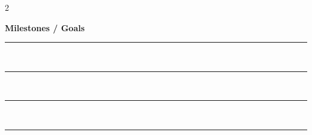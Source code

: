 \documentclass[10pt,letterpaper]{article}
\begin{document}
\begin{paracol}{2}
\begin{tcolorbox}[sheetbox,title=\textbf{Advancement \& Notes},breakable]
\textbf{Milestones / Goals}\\[-6pt]
\rule{\columnwidth}{0.4pt}\\[-4pt]
\rule{\columnwidth}{0.4pt}\\[-4pt]
\rule{\columnwidth}{0.4pt}\\[-4pt]
\rule{\columnwidth}{0.4pt}
\end{tcolorbox}

\end{paracol}
\end{document}
